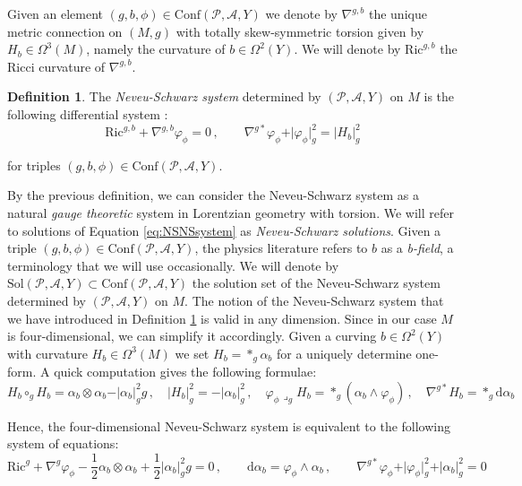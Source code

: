 \documentclass[10pt,reqno,a4paper]{amsart}
\theoremstyle{plain}
\theoremstyle{definition}
\newtheorem{definition}[thm]{Definition}
\theoremstyle{remark}
\theoremstyle{remark}
\def\dd{\mathrm{d}}
\def\Conf{\mathrm{Conf}}
\def\Sol{\mathrm{Sol}}
\def\cA{\mathcal{A}}
\def\cP{\mathcal{P}}
\newcommand{\Ric}{\mathrm{Ric}}
\renewcommand{\(}{ (}
\renewcommand{\)}{ )}
\begin{document}
 
 \noindent
 Given an element $(g,b,\phi)\in \Conf(\cP, \cA, Y)$ we denote by $\nabla^{g,b}$ the unique metric connection on $(M,g)$ with totally skew-symmetric torsion given by $H_b\in \Omega^3(M)$, namely the curvature of $b\in\Omega^2(Y)$. We will denote by $\Ric^{g,b}$ the Ricci curvature of $\nabla^{g,b}$. 
 
 \begin{definition}
 	\label{label:NSNSsystem}
 	The \emph{Neveu-Schwarz system} determined by $(\cP, \cA, Y)$ on $M$ is the following differential system \cite{Ortin,Tomasiello}:
 	\begin{equation}
 		\label{eq:NSNSsystem}
 		\Ric^{g,b} + \nabla^{g,b} \varphi_{\phi}  = 0\, , \qquad  \nabla^{g\ast}\varphi_{\phi} +  \vert \varphi_{\phi}\vert_g^2 = \vert H_b\vert^2_g  
 	\end{equation}
 	
 	\noindent
 	for triples $(g,b,\phi)\in \Conf(\cP, \cA, Y)$.
 \end{definition}
 
 \noindent
 By the previous definition, we can consider the Neveu-Schwarz system as a natural \emph{gauge theoretic} system in Lorentzian geometry with torsion. We will refer to solutions of Equation \eqref{eq:NSNSsystem} as \emph{Neveu-Schwarz solutions}. Given a triple $(g,b,\phi)\in \Conf(\cP, \cA, Y)$, the physics literature refers to $b$ as a \emph{b-field}, a terminology that we will use occasionally. We will denote by $\Sol(\cP, \cA, Y)\subset \Conf(\cP, \cA, Y)$ the solution set of the Neveu-Schwarz system determined by $(\cP, \cA, Y)$ on $M$. The notion of the Neveu-Schwarz system that we have introduced in Definition \ref{label:NSNSsystem} is valid in any dimension. Since in our case $M$ is four-dimensional, we can simplify it accordingly. Given a curving $b\in \Omega^2(Y)$ with curvature $H_b \in \Omega^3(M)$ we set $H_b = \ast_g \alpha_b$ for a uniquely determine one-form. A quick computation gives the following formulae:
 \begin{equation*}
 	H_b\circ_g H_b = \alpha_b\otimes \alpha_b - \vert\alpha_b\vert_g^2 g\, , \quad \vert H_b\vert^2_g  = - \vert \alpha_b\vert^2_g\, , \quad \varphi_{\phi}\lrcorner_g H_b =\ast_g (\alpha_b \wedge \varphi_{\phi})\, , \quad \nabla^{g\ast} H_b = \ast_g \dd\alpha_b 
 \end{equation*}
 
 \noindent
 Hence, the four-dimensional Neveu-Schwarz system is equivalent to the following system of equations:
 \begin{equation}
 	\label{eq:NSNSsystem4d}
 	\Ric^g + \nabla^g \varphi_{\phi} - \frac{1}{2} \alpha_b \otimes \alpha_b + \frac{1}{2} \vert\alpha_b\vert_g^2 g= 0\, , \qquad \dd \alpha_b = \varphi_{\phi}\wedge \alpha_b \, , \qquad    \nabla^{g\ast}\varphi_{\phi} +  \vert \varphi_{\phi}\vert_g^2 + \vert\alpha_b\vert^2_g = 0
 \end{equation} 
 
\end{document}
